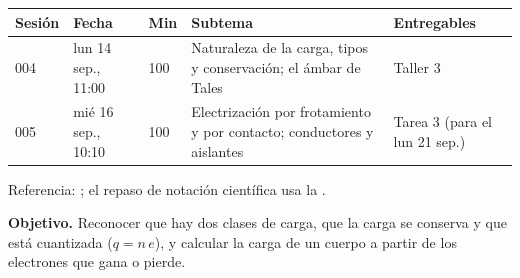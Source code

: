 \documentclass[11pt]{article}
\begin{document}
\encabezado*

\begin{center}
{\renewcommand{\arraystretch}{1.3}
\begin{tabularx}{\linewidth}{@{}l l l X l@{}}
  \toprule
  \textbf{Sesión} & \textbf{Fecha} & \textbf{Min} & \textbf{Subtema} & \textbf{Entregables}\\
  \midrule
  004 & lun 14 sep., 11:00 & 100 & Naturaleza de la carga, tipos y conservación; el ámbar de Tales & Taller 3\\
  005 & mié 16 sep., 10:10 & 100 & Electrización por frotamiento y por contacto; conductores y aislantes & Tarea 3 (para el lun 21 sep.)\\
  \bottomrule
\end{tabularx}}
\end{center}

Referencia: ; el repaso de notación científica usa la
.


\textbf{Objetivo.} Reconocer que hay dos clases de carga, que la carga se conserva y que está
cuantizada ($q = n\,e$), y calcular la carga de un cuerpo a partir de los electrones que gana
o pierde.
\end{document}

